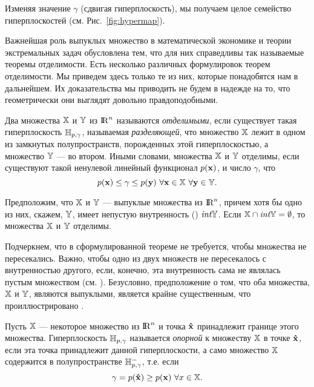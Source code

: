 Изменяя значение $\gamma$ (сдвигая гиперплоскость), мы получаем
целое семейство гиперплоскостей (см. Рис.~\ref{fig:hypermap}).




    Важнейшая роль выпуклых множество в математической экономике и теории экстремальных задач
    обусловлена тем, что для них справедливы так называемые теоремы отделимости.
    Есть несколько различных формулировок теорем отделимости. Мы приведем здесь только те из них,
    которые понадобятся нам в дальнейшем. Их доказательства мы приводить не будем в надежде на то,
    что геометрически они выглядят довольно правдоподобными.

    Два множества $\mathbb{X}$ и $\mathbb{Y}$ из ${\rm I\!R}^n$ называются
    \emph{отделимыми}, если существует такая гиперплоскость
    $\mathbb{H}_{p,\gamma}$, называемая \emph{разделяющей}, что множество
    $\mathbb{X}$ лежит в одном
    из замкнутых полупространств, порожденных этой гиперплоскостью,
    а множество $\mathbb{Y}$ --- во втором. Иными словами, множества $\mathbb{X}$ и
    $\mathbb{Y}$ отделимы, если существуют такой ненулевой линейный функционал $p(\mathbf{x})$,
    и число $\gamma$, что
\[
    p(\vc{x})\leq\gamma\leq p(\vc{y}) \ \forall \vc{x}\in\st{X} \ \forall \vc{y}\in\st{Y}.
\]




\begin{teo}[отделимости]
  \label{teo-otd-1}
    Предположим, что $\mathbb{X}$ и $\mathbb{Y}$ --- выпуклые множества из
    ${\rm I\!R}^n$, причем хотя бы одно из них, скажем, $\mathbb{Y}$, имеет
    непустую внутренность () $\emph{int}\mathbb{Y}$. Если
    $\mathbb{X}\cap\emph{int}\mathbb{Y}=\emptyset$, то множества $\mathbb{X}$ и
    $\mathbb{Y}$ отделимы.
\end{teo}

     Подчеркнем, что в
    сформулированной теореме не требуется, чтобы множества не пересекались. Важно, чтобы
    одно из двух множеств не пересекалось с внутренностью другого, если, конечно, эта
    внутренность сама не являлась пустым множеством (см. ).
    Безусловно, предположение о том, что оба множества, $\mathbb{X}$ и $\mathbb{Y}$,
    являются выпуклыми, является крайне существенным, что проиллюстрировано .


    Пусть $\mathbb{X}$ --- некоторое множество из ${\rm I\!R}^{n}$ и точка
    $\mathbf{\hat{x}}$ принадлежит границе этого множества. Гиперплоскость
    $\mathbb{H}_{p,\gamma}$ называется \emph{опорной} к множеству $\mathbb{X}$
    в точке $\mathbf{\hat{x}}$, если эта точка принадлежит
    данной гиперплоскости, а само множество $\mathbb{X}$ содержится в
    полупространстве $\mathbb{H}_{p,\gamma}^{-}$, т.е. если
    \[\gamma=p(\mathbf{\hat{x}})\geq p(\mathbf{x}) \ \forall x\in\mathbb{X}.\]

